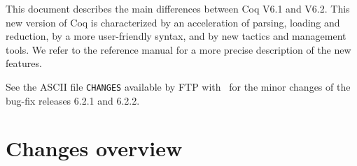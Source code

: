 \documentclass[11pt]{article}
\begin{document}

This document describes the main differences between Coq V6.1 and
V6.2.  This new version of Coq is characterized by an acceleration of
parsing, loading and reduction, by a more user-friendly syntax, and by
new tactics and management tools.  
We refer to the reference manual
for a more precise description of the new features.

See the ASCII file \texttt{CHANGES} available by FTP with \Coq\ for
the minor changes of the bug-fix releases 6.2.1 and 6.2.2.


\section{Changes overview}
\end{document}
